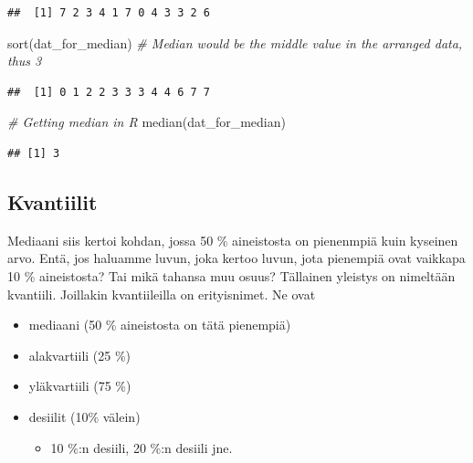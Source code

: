 \documentclass[
]{book}
\newenvironment{Shaded}{\begin{snugshade}}{\end{snugshade}}
\newcommand{\CommentTok}[1]{\textcolor[rgb]{0.56,0.35,0.01}{\textit{#1}}}
\newcommand{\FunctionTok}[1]{\textcolor[rgb]{0.00,0.00,0.00}{#1}}
\newcommand{\NormalTok}[1]{#1}
\providecommand{\tightlist}{%
  \setlength{\itemsep}{0pt}\setlength{\parskip}{0pt}}
\begin{document}
\begin{verbatim}
##  [1] 7 2 3 4 1 7 0 4 3 3 2 6
\end{verbatim}

\begin{Shaded}
\begin{Highlighting}[]
\FunctionTok{sort}\NormalTok{(dat\_for\_median) }\CommentTok{\# Median would be the middle value in the arranged data, thus 3}
\end{Highlighting}
\end{Shaded}

\begin{verbatim}
##  [1] 0 1 2 2 3 3 3 4 4 6 7 7
\end{verbatim}

\begin{Shaded}
\begin{Highlighting}[]
\CommentTok{\# Getting median in R}
\FunctionTok{median}\NormalTok{(dat\_for\_median)}
\end{Highlighting}
\end{Shaded}

\begin{verbatim}
## [1] 3
\end{verbatim}

\hypertarget{kvantiilit}{%
\subsection{Kvantiilit}\label{kvantiilit}}

Mediaani siis kertoi kohdan, jossa 50 \% aineistosta on pienenmpiä kuin kyseinen arvo. Entä, jos haluamme luvun, joka kertoo luvun, jota pienempiä ovat vaikkapa 10 \% aineistosta? Tai mikä tahansa muu osuus? Tällainen yleistys on nimeltään kvantiili. Joillakin kvantiileilla on erityisnimet. Ne ovat

\begin{itemize}
\tightlist
\item
  mediaani (50 \% aineistosta on tätä pienempiä)
\item
  alakvartiili (25 \%)
\item
  yläkvartiili (75 \%)
\item
  desiilit (10\% välein)

  \begin{itemize}
  \tightlist
  \item
    10 \%:n desiili, 20 \%:n desiili jne.
  \end{itemize}
\end{itemize}
\end{document}
